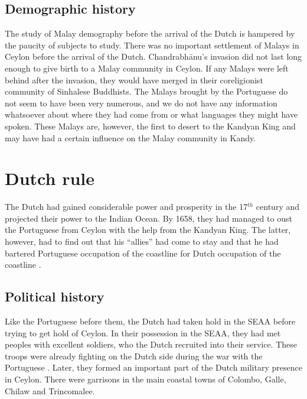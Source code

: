 
\subsection{Demographic history}\label{sec:slmbg:DemographichistorybeforearrivaloftheDutch}
The study of Malay demography before the arrival of the Dutch is hampered by the paucity of subjects to study. There
was no important settlement of Malays in Ceylon before the arrival
of the Dutch. Chandrabh\=anu's invasion did not last long enough
to give birth to a Malay community in Ceylon.  If any Malays were
left behind after the invasion, they would have merged in their
coreligionist community of Sinhalese Buddhists. The Malays brought
by the Portuguese do not seem to have been very numerous, and we
do not have any information whatsoever about  where they had come from or
what languages they might have spoken. These Malays are, however,
the first to desert to the Kandyan King and may have had a certain
influence on the Malay community in Kandy.


\section{Dutch rule}\label{sec:slmbg:HistoryduringDutchrule}
The Dutch had gained considerable power and prosperity in the 17$^{th}$ century and projected their power to the Indian Ocean. By 1658, they had managed to oust the Portuguese from Ceylon with the help from the Kandyan King. The latter, however, had to find out that his ``allies'' had come to stay and that he had bartered Portuguese occupation of the coastline  for Dutch occupation of the coastline \citep[133]{Desilva1981}.

\subsection{Political history}\label{sec:slmbg:Dutch:Political history}
Like the Portuguese before them, the Dutch had taken hold in the SEAA before trying to get hold of Ceylon.  In their possession in the SEAA, they had met peoples with excellent soldiers, who the Dutch recruited into their service. These troops were already fighting on the Dutch side during the war with the Portuguese  \citep[44]{Hussainmiya1990}.
Later, they formed an important part of the Dutch military presence in Ceylon.  There were garrisons in the main coastal towns of Colombo, Galle, Chilaw and Trincomalee.

